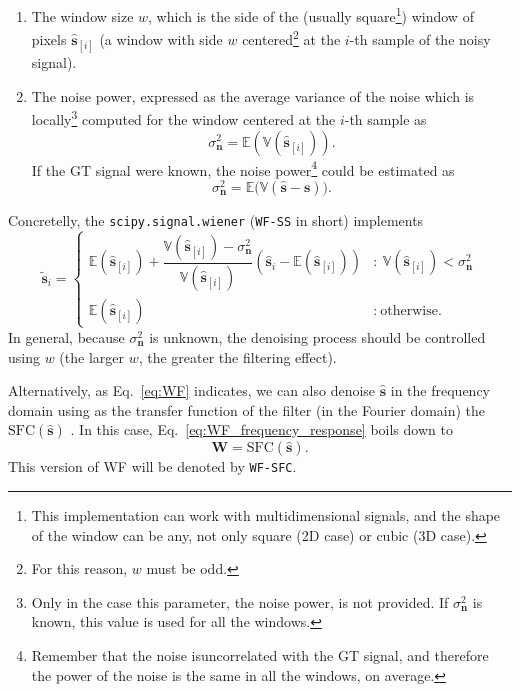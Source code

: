 \begin{enumerate}
\item The window size $w$, which is the side of the (usually
  square\footnote{This implementation can work with multidimensional
    signals, and the shape of the window can be any, not only square
    (2D case) or cubic (3D case).}) window of pixels
  $\hat{\mathbf{s}}_{[i]}$ (a window with side $w$
  centered\footnote{For this reason, $w$ must be odd.} at the $i$-th
  sample of the noisy signal).
\item The noise power, expressed as the average variance of the noise
  which is locally\footnote{Only in the case this parameter, the noise
    power, is not provided. If ${\sigma^2_{\mathbf{n}}}$ is known,
    this value is used for all the windows.} computed for the window
  centered at the $i$-th sample as
  \begin{equation}
    {\sigma^2_{\mathbf{n}}}=\mathbb{E}\left(\mathbb{V}(\hat{\mathbf{s}}_{[i]})\right).
  \end{equation}
  If the \gls{GT} signal were known, the noise power\footnote{Remember that
    the noise isuncorrelated with the GT signal, and therefore the
    power of the noise is the same in all the windows, on average.}
  could be estimated as
  \begin{equation}
    {\sigma^2_{\mathbf{n}}} = \mathbb{E}\big(\mathbb{V}(\hat{\mathbf{s}}-\mathbf{s})\big).
  \end{equation}
\end{enumerate}
Concretelly, the \texttt{scipy.signal.wiener} (\texttt{WF-SS} in short) implements
\begin{equation}
  \tilde{\mathbf{s}}_i = \left\{
    \begin{array}{ll}
      \mathbb{E}(\hat{\mathbf{s}}_{[i]}) + \dfrac{\mathbb{V}(\hat{\mathbf{s}}_{[i]})-\sigma^2_\mathbf{n}}{\mathbb{V}(\hat{\mathbf{s}}_{[i]})}\left(\hat{\mathbf{s}}_i-\mathbb{E}(\hat{\mathbf{s}}_{[i]})\right) & : \ \mathbb{V}(\hat{\mathbf{s}}_{[i]}) < \sigma^2_\mathbf{n} \\
      \mathbb{E}(\hat{\mathbf{s}}_{[i]}) & : \ \text{otherwise.}
    \end{array} \right.
\end{equation}
In general, because $\sigma^2_{\mathbf{n}}$ is unknown, the denoising
process should be controlled using $w$ (the larger $w$, the greater
the filtering effect).

Alternatively, as Eq.~\ref{eq:WF} indicates, we can also denoise
$\hat{\mathbf{s}}$ in the frequency domain using as the transfer
function of the filter (in the Fourier domain) the
$\text{SFC}(\hat{\mathbf{s}})$ \cite{verbeke2024self}. In this case,
Eq.~\ref{eq:WF_frequency_response} boils down to
\begin{equation}
  \mathbf{W} = \text{SFC}(\hat{\mathbf{s}}).
  \label{eq:WF_SFC}
\end{equation}
This version of \gls{WF} will be denoted by \texttt{WF-SFC}.

\begin{comment}
If the \gls{GT} were known, Eq.~\ref{eq:WF_SFC} becomes
\begin{equation}
  \mathbf{W}(\mathbf{x}) = \text{SFC}(\mathbf{x}).
  \label{eq:WF_SFC*}
\end{equation}
We will refer to this filter as ``Wiener-SFC''.
\end{comment}

